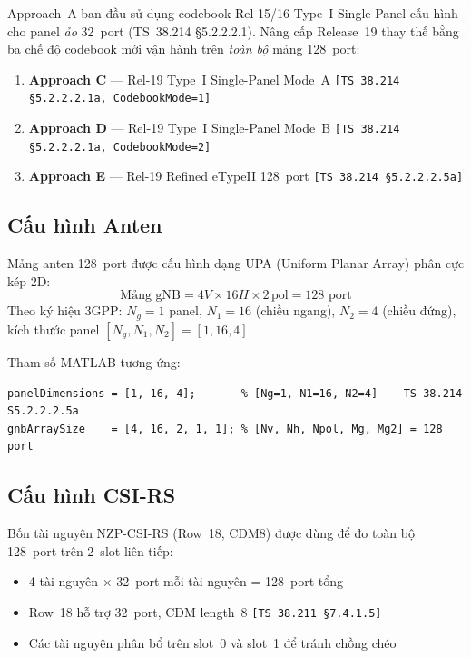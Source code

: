 \documentclass[12pt, a4paper]{article}
\newcommand{\spec}[1]{\textcolor{green!40!black}{\texttt{[#1]}}}
\begin{document}
Approach~A ban đầu sử dụng codebook Rel-15/16 Type~I Single-Panel
cấu hình cho panel \emph{ảo} 32~port (TS~38.214 \S5.2.2.2.1). Nâng
cấp Release~19 thay thế bằng ba chế độ codebook mới vận hành trên
\emph{toàn bộ} mảng 128~port:

\begin{enumerate}
  \item \textbf{Approach C} — Rel-19 Type~I Single-Panel Mode~A
        \spec{TS~38.214 \S5.2.2.2.1a, CodebookMode=1}
  \item \textbf{Approach D} — Rel-19 Type~I Single-Panel Mode~B
        \spec{TS~38.214 \S5.2.2.2.1a, CodebookMode=2}
  \item \textbf{Approach E} — Rel-19 Refined eTypeII 128~port
        \spec{TS~38.214 \S5.2.2.2.5a}
\end{enumerate}

\subsection{Cấu hình Anten}

Mảng anten 128~port được cấu hình dạng UPA (Uniform Planar Array)
phân cực kép 2D:
\[
  \text{Mảng gNB} = 4V \times 16H \times 2\,\text{pol} = 128\text{ port}
\]
Theo ký hiệu 3GPP: $N_g = 1$ panel, $N_1 = 16$ (chiều ngang),
$N_2 = 4$ (chiều đứng), kích thước panel $[N_g, N_1, N_2] = [1, 16, 4]$.

Tham số MATLAB tương ứng:
\begin{lstlisting}
panelDimensions = [1, 16, 4];       % [Ng=1, N1=16, N2=4] -- TS 38.214 S5.2.2.2.5a
gnbArraySize    = [4, 16, 2, 1, 1]; % [Nv, Nh, Npol, Mg, Mg2] = 128 port
\end{lstlisting}

\subsection{Cấu hình CSI-RS}

Bốn tài nguyên NZP-CSI-RS (Row~18, CDM8) được dùng để đo toàn bộ
128~port trên 2~slot liên tiếp:
\begin{itemize}[nosep]
  \item 4 tài nguyên $\times$ 32~port mỗi tài nguyên = 128~port tổng
  \item Row~18 hỗ trợ 32~port, CDM length~8 \spec{TS~38.211 \S7.4.1.5}
  \item Các tài nguyên phân bổ trên slot~0 và slot~1 để tránh chồng chéo
\end{itemize}
\end{document}
